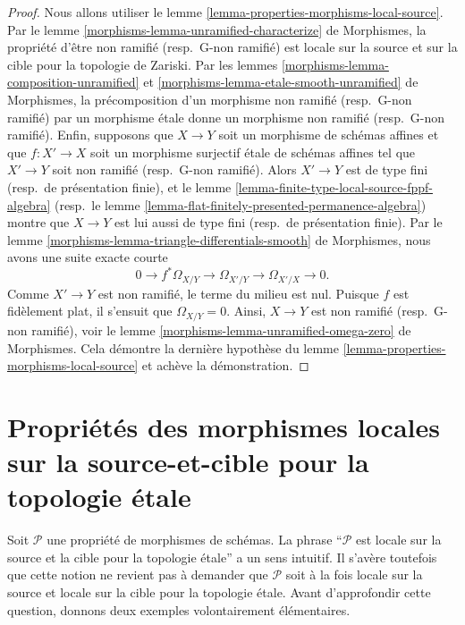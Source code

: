 \begin{proof}
Nous allons utiliser le
lemme \ref{lemma-properties-morphisms-local-source}.
Par le lemme \ref{morphisms-lemma-unramified-characterize} de Morphismes,
la propriété d'être non ramifié (resp.\ G-non ramifié)
est locale sur la source et sur la cible pour la topologie de Zariski. Par les
lemmes \ref{morphisms-lemma-composition-unramified} et
\ref{morphisms-lemma-etale-smooth-unramified} de Morphismes,
la précomposition d'un morphisme non ramifié (resp.\ G-non ramifié)
par un morphisme \'etale donne un morphisme non ramifié
(resp.\ G-non ramifié).
Enfin, supposons que $X \to Y$ soit un morphisme de schémas affines et que
$f : X' \to X$ soit un morphisme surjectif \'etale de schémas affines tel que
$X' \to Y$ soit non ramifié (resp.\ G-non ramifié).
Alors $X' \to Y$ est de type fini (resp.\ de présentation finie), et le
lemme \ref{lemma-finite-type-local-source-fppf-algebra}
(resp.\ le lemme \ref{lemma-flat-finitely-presented-permanence-algebra})
montre que $X \to Y$ est lui aussi de type fini
(resp.\ de présentation finie). Par
le lemme \ref{morphisms-lemma-triangle-differentials-smooth} de Morphismes,
nous avons une suite exacte courte
$$
0 \to f^*\Omega_{X/Y} \to \Omega_{X'/Y} \to \Omega_{X'/X} \to 0.
$$
Comme $X' \to Y$ est non ramifié, le terme du milieu est nul.
Puisque $f$ est fidèlement plat, il s'ensuit que $\Omega_{X/Y} = 0$.
Ainsi, $X \to Y$ est non ramifié (resp.\ G-non ramifié), voir le
lemme \ref{morphisms-lemma-unramified-omega-zero} de Morphismes.
Cela démontre la dernière hypothèse du
lemme \ref{lemma-properties-morphisms-local-source}
et achève la démonstration.
\end{proof}




\section[Localité source-cible (\'etale)]{Propriétés des morphismes locales sur la source-et-cible pour la topologie \'etale}
\label{section-properties-etale-local-source-target}

\noindent
Soit $\mathcal{P}$ une propriété de morphismes de schémas. La phrase
``$\mathcal{P}$ est locale sur la source et la cible pour la topologie \'etale''
a un sens intuitif. Il s'avère toutefois que cette notion ne revient pas à
demander que $\mathcal{P}$ soit à la fois locale sur la source et locale sur
la cible pour la topologie \'etale.
Avant d'approfondir cette question, donnons deux exemples volontairement
élémentaires.

